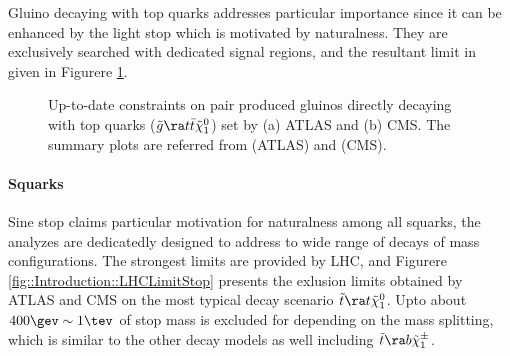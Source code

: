 Gluino decaying with top quarks addresses particular importance since it can be enhanced by the light stop which is motivated by naturalness. They are exclusively searched with dedicated signal regions, and the resultant limit in given in Figurere \ref{fig::Introduction::LHCLimitGtt}.

\begin{figure}[h]
  \centering
    \caption{Up-to-date constraints on pair produced gluinos directly decaying with top quarks ($\tg \ra t\bar{t} \tLSP$) set by (a) ATLAS and (b) CMS.
    The summary plots are referred from \cite{ATLAS_SUSY_PublicResult} (ATLAS) and \cite{CMS_SUSY_PubResult} (CMS). 
    }
    \label{fig::Introduction::LHCLimitGtt}
\end{figure}


\paragraph{Squarks}
Sine stop claims particular motivation for naturalness among all squarks, 
the analyzes are dedicatedly designed to address to wide range of decays of mass configurations.
The strongest limits are provided by LHC, and Figurere \ref{fig::Introduction::LHCLimitStop} presents the exlusion limits obtained by ATLAS and CMS on the most typical decay scenario $\ttop \ra t \tilde{\chi}_1^0$.
Upto about $400\gev \sim 1\tev$ of stop mass is excluded for depending on the mass splitting, which is similar to the other decay models as well including $\ttop \ra b \tchic$.

